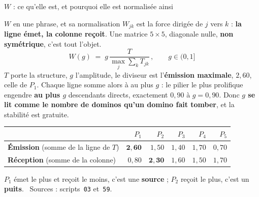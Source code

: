 \documentclass[11pt]{beamer}
\begin{document}
\begin{frame}{\texorpdfstring{$W$}{W} : ce qu'elle est, et pourquoi elle est normalisée ainsi}
\scriptsize
\begin{block}{$W$ en une phrase, et sa normalisation}
$W_{jk}$ est la force dirigée de $j$ vers $k$ : \textbf{la ligne émet, la colonne reçoit}. Une
matrice $5\times5$, diagonale nulle, \textbf{non symétrique}, c'est tout l'objet.
\[
  W(g) \;=\; g\,\frac{T}{\max_j \sum_k T_{jk}}\,, \qquad g \in (0,1]
\]
$T$ porte la structure, $g$ l'amplitude, le diviseur est l'\textbf{émission maximale}, $2{,}60$,
celle de $P_1$. Chaque ligne somme alors à au plus $g$ : le pilier le plus prolifique engendre
\textbf{au plus $g$} descendants directs, exactement $0{,}90$ à $g = 0{,}90$. Donc \textbf{$g$ se
lit comme le nombre de dominos qu'un domino fait tomber}, et la stabilité est gratuite.
\end{block}
\vspace{-1mm}
\begin{center}\scriptsize
\begin{tabular}{@{}l r r r r r@{}}
\toprule
 & $P_1$ & $P_2$ & $P_3$ & $P_4$ & $P_5$ \\
\midrule
\textbf{Émission} (somme de la ligne de $T$) & $\mathbf{2{,}60}$ & $1{,}50$ & $1{,}40$ & $1{,}70$ & $0{,}70$ \\
\textbf{Réception} (somme de la colonne) & $0{,}80$ & $\mathbf{2{,}30}$ & $1{,}60$ & $1{,}50$ & $1{,}70$ \\
\bottomrule
\end{tabular}
\end{center}
\vspace{0.5mm}
{\scriptsize $P_1$ émet le plus et reçoit le moins, c'est une \textbf{source} ; $P_2$ reçoit le
plus, c'est un \textbf{puits}. \ Sources : scripts~\texttt{03} et~\texttt{59}.}
\end{frame}
\end{document}

